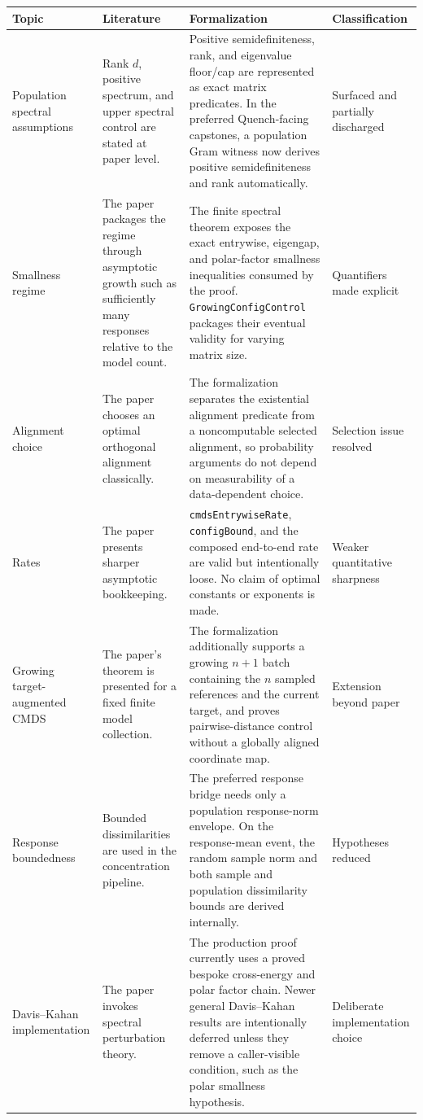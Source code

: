 \documentclass[11pt]{article}
\newcommand{\code}[1]{\texttt{#1}}
\begin{document}
\begin{longtable}{>{\raggedright\arraybackslash}p{}
                  >{\raggedright\arraybackslash}p{}
                  >{\raggedright\arraybackslash}p{}
                  >{\raggedright\arraybackslash}p{}}
\toprule
Topic & Literature & Formalization & Classification \\
\midrule
\endhead
Population spectral assumptions & Rank \(d\), positive spectrum, and upper
spectral control are stated at paper level. & Positive semidefiniteness, rank,
and eigenvalue floor/cap are represented as exact matrix predicates.  In the
preferred Quench-facing capstones, a population Gram witness now derives
positive semidefiniteness and rank automatically. & Surfaced and partially
discharged \\
\addlinespace
Smallness regime & The paper packages the regime through asymptotic growth such
as sufficiently many responses relative to the model count. & The finite
spectral theorem exposes the exact entrywise, eigengap, and polar-factor
smallness inequalities consumed by the proof.  \code{GrowingConfigControl}
packages their eventual validity for varying matrix size. & Quantifiers made
explicit \\
\addlinespace
Alignment choice & The paper chooses an optimal orthogonal alignment
classically. & The formalization separates the existential alignment predicate
from a noncomputable selected alignment, so probability arguments do not depend
on measurability of a data-dependent choice. & Selection issue resolved \\
\addlinespace
Rates & The paper presents sharper asymptotic bookkeeping. &
\code{cmdsEntrywiseRate}, \code{configBound}, and the composed end-to-end rate
are valid but intentionally loose.  No claim of optimal constants or exponents
is made. & Weaker quantitative sharpness \\
\addlinespace
Growing target-augmented CMDS & The paper's theorem is presented for a fixed
finite model collection. & The formalization additionally supports a growing
\(n+1\) batch containing the \(n\) sampled references and the current target,
and proves pairwise-distance control without a globally aligned coordinate
map. & Extension beyond paper \\
\addlinespace
Response boundedness & Bounded dissimilarities are used in the concentration
pipeline. & The preferred response bridge needs only a population response-norm
envelope.  On the response-mean event, the random sample norm and both sample
and population dissimilarity bounds are derived internally. & Hypotheses
reduced \\
\addlinespace
Davis--Kahan implementation & The paper invokes spectral perturbation theory. &
The production proof currently uses a proved bespoke cross-energy and polar
factor chain.  Newer general Davis--Kahan results are intentionally deferred
unless they remove a caller-visible condition, such as the polar smallness
hypothesis. & Deliberate implementation choice \\
\bottomrule
\end{longtable}
\end{document}
